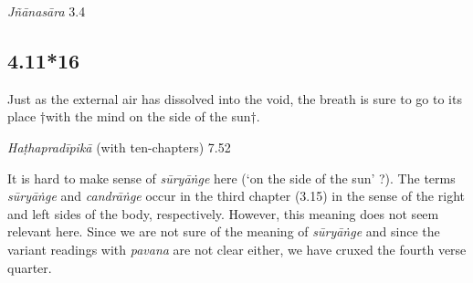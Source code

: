 \begin{ekdosis}
\begin{sources}[hp04_011_15]
\emph{Jñānasāra} 3.4
\begin{versinnote}
\end{versinnote}

\end{sources}



\subsection*{4.11*16}
\begin{translation}[hp04_011_16]
Just as the external air has dissolved into the void, the breath is sure to go to its place †with the mind on the side of the sun†.
\end{translation}


\begin{testimonia}[hp04_011_16]
\emph{Haṭhapradīpikā} (with ten-chapters) 7.52 
\begin{versinnote}
\end{versinnote}
\end{testimonia}

\begin{philcomm}[hp04_011_16]
It is hard to make sense of \emph{sūryāṅge} here (`on the side of the sun' ?). The terms \emph{sūryāṅge} and \emph{candrāṅge} occur in the third chapter (3.15) in the sense of the right and left sides of the body, respectively. However, this meaning does not seem relevant here. Since we are not sure of the meaning of \emph{sūryāṅge} and since the variant readings with \emph{pavana} are not clear either, we have cruxed the fourth verse quarter.      
\end{philcomm}


\end{ekdosis}
